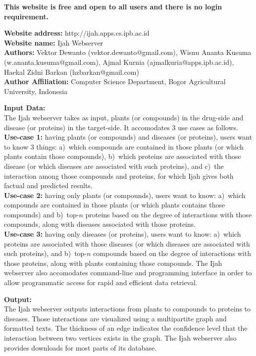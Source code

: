 \textbf{This website is free and open to all users and there is no login requirement.}

\noindent
\textbf{Website address:} http://ijah.apps.cs.ipb.ac.id \\
\textbf{Website name:} Ijah Webserver \\
\textbf{Authors:}
Vektor Dewanto (vektor.dewanto@gmail.com),
Wisnu Ananta Kusuma (w.ananta.kusuma@gmail.com),
Ajmal Kurnia (ajmalkuria@apps.ipb.ac.id),
Haekal Zidni Barkan (hzbarkan@gmail.com) \\
\textbf{Author Affiliation:}
Computer Science Department, Bogor Agricultural University, Indonesia

\noindent
\textbf{Input Data:} \\
The Ijah webserver takes as input,
plants (or compounds) in the drug-side and disease (or proteins) in the target-side.
It accomodates 3 use cases as follows.\\
\textbf{Use-case 1:}
having plants (or compounds) and diseases (or proteins),
users want to know 3 things:
a)~which compounds are contained in those plants (or which plants contain those compounds),
b)~which proteins are associated with those disease (or which diseases are associated with such proteins), and
c)~the interaction among those compounds and proteins, for which Ijah gives both factual and predicted results.\\
\textbf{Use-case 2:}
having only plants (or compounds),
users want to know:
a)~which compounds are contained in those plants (or which plants contains those compounds) and
b)~top-$n$ proteins based on the degree of interactions with those compounds, along with diseases associated with those proteins.\\
\textbf{Use-case 3:}
having only diseases (or proteins),
users want to know:
a)~which proteins are associated with those diseases (or which diseases are associated with such proteins), and
b)~\mbox{top-$n$} compounds based on the degree of interactions with those proteins, along with plants containing those compounds.
The Ijah webserver also accomodates command-line and programming interface in order to allow
programmatic access for rapid and efficient data retrieval.

\noindent
\textbf{Output:} \\
The Ijah webserver outputs interactions from plants to compounds to proteins to diseases.
Those interactions are visualized using a multipartite graph and formatted texts.
The thickness of an edge indicates the confidence level that the interaction between two vertices exists in the graph.
The Ijah webserver also provides downloads for most parts of its database.

